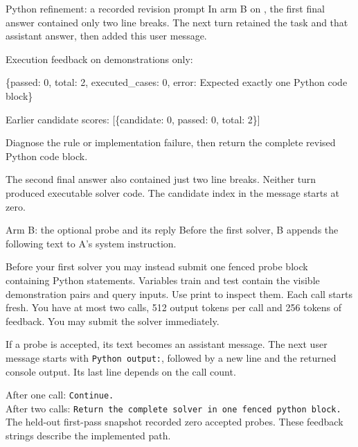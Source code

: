 \begin{frame}[t]{Python refinement: a recorded revision prompt}
\med In arm B on , the first final answer contained only two line breaks. The next turn retained the task and that assistant answer, then added this user message.
\par\vspace{4mm}
{\fontsize{14}{17}\selectfont\ttfamily\raggedright Execution feedback on demonstrations only:\par}
{\fontsize{14}{17}\selectfont\ttfamily\raggedright \{\textquotedbl{}passed\textquotedbl{}: 0, \textquotedbl{}total\textquotedbl{}: 2, \textquotedbl{}executed\_cases\textquotedbl{}: 0, \textquotedbl{}error\textquotedbl{}: \textquotedbl{}Expected exactly one Python code block\textquotedbl{}\}\par}
{\fontsize{14}{17}\selectfont\ttfamily\raggedright Earlier candidate scores: [\{\textquotedbl{}candidate\textquotedbl{}: 0, \textquotedbl{}passed\textquotedbl{}: 0, \textquotedbl{}total\textquotedbl{}: 2\}]\par}
{\fontsize{14}{17}\selectfont\ttfamily\raggedright Diagnose the rule or implementation failure, then return the complete revised Python code block.\par}
\vfill\smallbody The second final answer also contained just two line breaks. Neither turn produced executable solver code. The candidate index in the message starts at zero.
\end{frame}

\begin{frame}[t]{Arm B: the optional probe and its reply}
\med Before the first solver, B appends the following text to A’s system instruction.
\par\vspace{3mm}
{\fontsize{14}{17}\selectfont\ttfamily\raggedright Before your first solver you may instead submit one fenced \textasciigrave{}\textasciigrave{}\textasciigrave{}probe block containing Python statements. Variables train and test contain the visible demonstration pairs and query inputs. Use print to inspect them. Each call starts fresh. You have at most two calls, 512 output tokens per call and 256 tokens of feedback. You may submit the solver immediately.\par}
\par\vspace{4mm}\med If a probe is accepted, its text becomes an assistant message. The next user message starts with \texttt{Python output:}, followed by a new line and the returned console output. Its last line depends on the call count.
\par\vspace{2mm}\smallbody After one call: \texttt{Continue.}\\[1mm]After two calls: \texttt{Return the complete solver in one fenced python block.}
\vfill\smallbody The held-out first-pass snapshot recorded zero accepted probes. These feedback strings describe the implemented path.
\end{frame}

\endgroup
